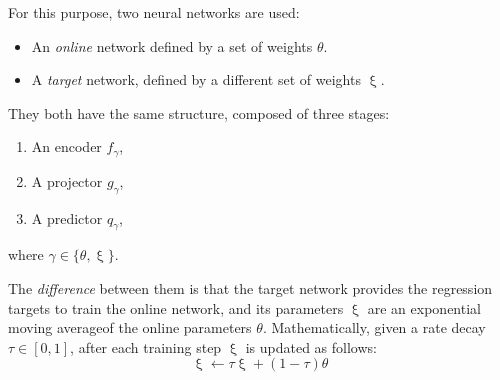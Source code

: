 For this purpose, two neural networks are used:
\begin{itemize}
\item An \emph{online} network defined by a set of weights $\theta$.

\item A \emph{target} network, defined by a different set of weights $\upxi$.
\end{itemize}

They both have the same structure, composed of three stages:
\begin{enumerate}
\item An encoder $f_\gamma$,
\item A projector $g_\gamma$,
\item A predictor $q_\gamma$,
\end{enumerate}
where $\gamma \in \{\theta,\upxi\}$.

The \emph{difference} between them is that the target network provides the regression targets to train the online network, and its parameters $\upxi$ are an exponential moving average\footnotemark of the online parameters $\theta$. Mathematically, given a rate decay $\tau \in [0,1]$, after each training step $\upxi$ is updated as follows:
\[
\upxi \leftarrow \tau \upxi + (1-\tau)\theta    
\]

